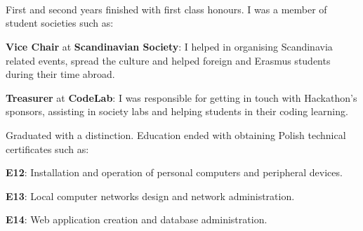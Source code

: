 \documentclass[]{deedy-resume-openfont}
\begin{document}
\begin{minipage}[t]{0.49\textwidth} 


 \section{ \quad \quad {} }
 \\
First and second years finished with first class honours. \newline
I was a member of student societies such as:
\vspace{\topsep}
\begin{tightemize}
\item \textbf{Vice Chair} at \textbf{Scandinavian Society}: I helped
\newline
in organising Scandinavia related events, spread the culture and helped foreign and Erasmus students 
\newline
during their time abroad.
\item \textbf{Treasurer} at \textbf{CodeLab}: I was responsible for getting 
\newline
in touch with Hackathon's sponsors, assisting in 
\newline
society labs and helping students in their coding learning.
\end{tightemize}
\sectionsep

\runsubsection{}
Graduated with a distinction. Education ended with 
\newline
obtaining Polish technical certificates such as:

\begin{tightemize}
\item  \textbf{E12}: Installation and operation of personal
\newline 
computers and peripheral devices.
\item \textbf{E13}: Local computer networks design and
\newline
network administration.
\item \textbf{E14}: Web application creation
and database administration.
\end{tightemize}
\sectionsep




\end{minipage}
\end{document}
